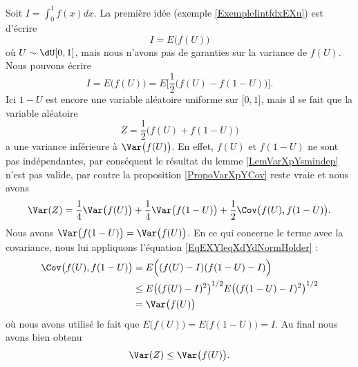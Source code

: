 Soit \( I=\int_0^1f(x)dx\). La première idée (exemple \ref{ExempleIintfdxEXu}) est d'écrire 
\begin{equation}
    I=E\big( f(U) \big)
\end{equation}
où \( U\sim\dU\mathopen[ 0 , 1 \mathclose]\), mais nous n'avons pas de garanties sur la variance de \( f(U)\). Nous pouvons écrire
\begin{equation}
    I=E\big( f(U) \big)=E\Big[ \frac{ 1 }{2}\big( f(U)-f(1-U) \big) \Big].
\end{equation}
Ici \( 1-U\) est encore une variable aléatoire uniforme sur \( \mathopen[ 0 , 1 \mathclose]\), mais il se fait que la variable aléatoire
\begin{equation}
    Z=\frac{ 1 }{2}\big( f(U)+f(1-U) \big)
\end{equation}
a une variance inférieure à \( \Var\big( f(U) \big)\). En effet, \( f(U)\) et \( f(1-U)\) ne sont pas indépendantes, par conséquent le résultat du lemme \ref{LemVarXpYsmindep} n'est pas valide, par contre la proposition \ref{PropoVarXpYCov} reste vraie et nous avons
\begin{equation}
    \Var(Z)=\frac{1}{ 4 }\Var\big( f(U) \big)+\frac{1}{ 4 }\Var\big( f(1-U) \big)+\frac{ 1 }{2}\Cov\big( f(U),f(1-U) \big).
\end{equation}
Nous avons \( \Var\big( f(1-U) \big)=\Var\big( f(U) \big)\). En ce qui concerne le terme avec la covariance, nous lui appliquons l'équation \eqref{EqEXYleqXdYdNormHolder} :
\begin{subequations}
    \begin{align}
        \Cov\big( f(U),f(1-U) \big)&=E\Big( (f(U)-I)(f(1-U)-I) \Big)\\
        &\leq E\big( (f(U)-I)^2 \big)^{1/2}E\big( (f(1-U)-I)^2 \big)^{1/2}\\
        &=\Var\big( f(U) \big)
    \end{align}
\end{subequations}
où nous avons utilisé le fait que \( E\big( f(U) \big)=E\big( f(1-U) \big)=I\). Au final nous avons bien obtenu
\begin{equation}
    \Var(Z)\leq \Var\big( f(U) \big).
\end{equation}
